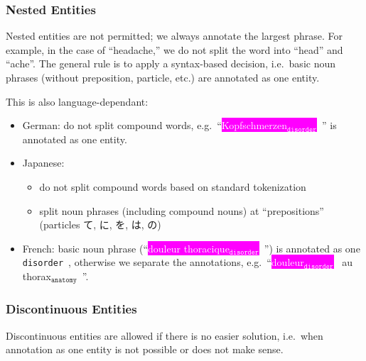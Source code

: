 \documentclass[12pt]{article}
\theoremstyle{definition}
\newcommand{\anatomy}[1]{\colorbox{dollarbill}{#1$_{\texttt{anatomy}}$}\ }
\newcommand{\disorder}[1]{\colorbox{fuchsia}{\textcolor{white}{#1$_{\texttt{disorder}}$}}\ }
\newcommand{\dis}{\texttt{disorder}\ }
\begin{document}
\subsubsection*{Nested Entities}

Nested entities are not permitted; we always annotate the largest phrase.
For example, in the case of ``headache,'' we do not split the word into ``head'' and ``ache''. 
The general rule is to apply a syntax-based decision, i.e.~basic noun phrases (without preposition, particle, etc.) are annotated as one entity.

This is also language-dependant:
\begin{itemize}
    \item German: do not split compound words, e.g.~``\disorder{Kopfschmerzen}'' is annotated as one entity.
    \item Japanese: 
    \begin{itemize}
        \item do not split compound words based on standard tokenization
        \item split noun phrases (including compound nouns) at ``prepositions'' (particles て, に, を, は, の)
    \end{itemize}
    
    \item French: basic noun phrase (``\disorder{douleur thoracique}'') is annotated as one \dis, otherwise  we separate the annotations, e.g.~``\disorder{douleur} au \anatomy{thorax}''.
\end{itemize}


\subsubsection*{Discontinuous Entities}

Discontinuous entities are allowed if there is no easier solution, i.e.~when annotation as one entity is not possible or does not make sense.
\end{document}
